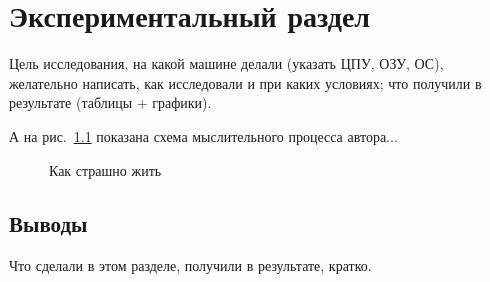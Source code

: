 \chapter{Экспериментальный раздел}
\label{cha:experimental}

Цель исследования, на какой машине делали (указать ЦПУ, ОЗУ, ОС), желательно написать, как исследовали и при каких условиях; что получили в результате (таблицы + графики).

А на рис.~\ref{fig:spire01} показана схема мыслительного процесса автора...

\begin{figure}
  \centering
  \caption{Как страшно жить}
  \label{fig:spire01}
\end{figure}

\section*{Выводы}

Что сделали в этом разделе, получили в результате, кратко.
